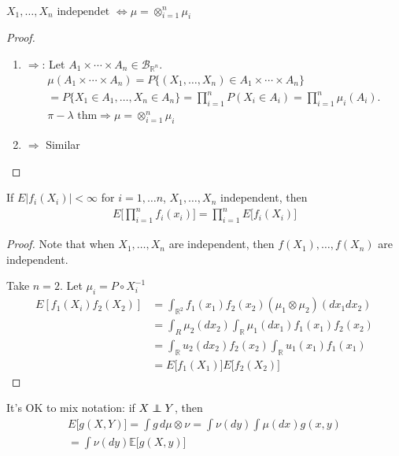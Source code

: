 \documentclass[11pt]{article}
\begin{document}
\begin{theorem}
    $X_1, \ldots ,X_n \text{ independet }\iff \mu = \otimes_{i=1}^{n}\mu_i$
\end{theorem}
\begin{proof}
    \,

    \begin{enumerate}
        \item $\Longrightarrow$:
        Let $A_1 \times \cdots \times A_n \in \mathcal{B}_{\mathbb{R}^{n}}$.
        \begin{align*}
            \mu(A_1 \times \cdots \times A_n) = P\{ (X_1, \ldots ,X_n) \in A_1 \times \cdots\times A_n \}\\
            = P\{ X_1 \in A_1, \ldots ,X_n \in A_n \} 
                = \prod_{i=1}^{n}P(X_{i} \in A_i) 
                = \prod_{i=1}^{n}\mu_i(A_i). \\
            \pi-\lambda \text{ thm} \Longrightarrow \mu = \otimes_{i=1}^{n}\mu_i
        \end{align*}
        \item $\Longrightarrow$ Similar
    \end{enumerate}
\end{proof}

\begin{corollary}
    If $E|f_i(X_{i})| < \infty$ for $i=1, \ldots n$, $X_1, \ldots ,X_n$ independent, then
    \begin{align*}
        E\Big[\prod_{i=1}^{n}f_i(x_i)  \Big] = \prod_{i=1}^{n}E\Big[f_i(X_{i})\Big] 
    \end{align*}
\end{corollary}
\begin{proof}
    Note that when $X_1, \ldots ,X_n$ are independent, then $f(X_1), \ldots ,f(X_n)$ are independent.

    Take $n=2$. Let $\mu_i = P \circ X_{i}^{-1}$
    \begin{align*}
        E[f_1(X_{i})f_2(X_{2})] &= \int_{\mathbb{R}^{2}}f_1(x_1)f_2(x_2)(\mu_1 \otimes \mu_2)(dx_1 dx_2)\\
        &= \int_{R}\mu_2(dx_2)\int_{\mathbb{R}}\mu_1(dx_1)f_1(x_1)f_2(x_2)\\
        &= \int _{\mathbb{R}}u_2(dx_2)f_2(x_2)\int_{\mathbb{R}}u_1(x_1)f_1(x_1)\\
        &= E\Big[f_1(X_1) \Big]E\Big[f_2(X_2)\Big]
    \end{align*}
\end{proof}
\begin{remark}
    It's OK to mix notation: if $X \independent Y$, then 
    \begin{align*}
        E\Big[g(X,Y)\Big] = \int g \, d \mu\otimes \nu = \int \nu(dy)\int \mu(dx) g(x,y)\\
        = \int \nu(dy)\mathbb{E}\Big[g(X,y)\Big]
    \end{align*}
\end{remark}
\end{document}
